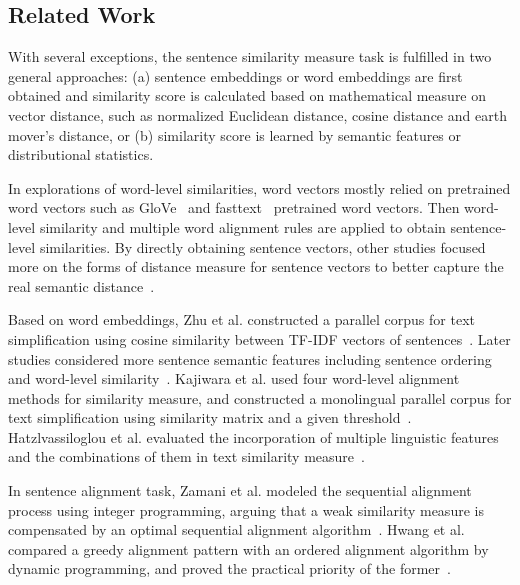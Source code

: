 \documentclass[runningheads]{llncs}
\begin{document}
\begin{spacing}{1.1}

\section{Related Work}
\label{sec:related}

With several exceptions, the sentence similarity measure task is fulfilled in two general approaches: (a) sentence embeddings or word embeddings are first obtained and similarity score is calculated based on mathematical measure on vector distance, such as normalized Euclidean distance, cosine distance and earth mover's distance, or (b) similarity score is learned by semantic features or distributional statistics.

In explorations of word-level similarities, word vectors mostly relied on pretrained word vectors such as GloVe~\cite{pennington2014glove} and fasttext~\cite{joulin2017bag} pretrained word vectors. Then word-level similarity and multiple word alignment rules are applied to obtain sentence-level similarities. By directly obtaining sentence vectors, other studies focused more on the forms of distance measure for sentence vectors to better capture the real semantic distance~\cite{kajiwara2016building}.

Based on word embeddings, Zhu et al. constructed a parallel corpus for text simplification using cosine similarity between TF-IDF vectors of sentences~\cite{zhu2010monolingual}. Later studies considered more sentence semantic features including sentence ordering~\cite{coster2011learning} and word-level similarity~\cite{hwang2015aligning}. Kajiwara et al. used four word-level alignment methods for similarity measure, and constructed a monolingual parallel corpus for text simplification using similarity matrix and a given threshold~\cite{kajiwara2016building}. Hatzlvassiloglou et al. evaluated the incorporation of multiple linguistic features and the combinations of them in text similarity measure~\cite{hatzlvassiloglou1999detecting}.

In sentence alignment task, Zamani et al. modeled the sequential alignment process using integer programming, arguing that a weak similarity measure is compensated by an optimal sequential alignment algorithm~\cite{zamani2016sentence}. Hwang et al. compared a greedy alignment pattern with an ordered alignment algorithm by dynamic programming, and proved the practical priority of the former~\cite{hwang2015aligning}.


\end{spacing}
\end{document}
